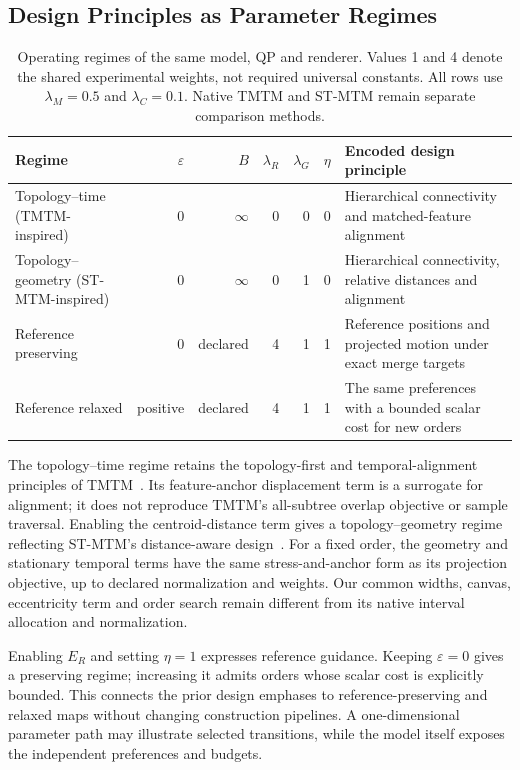 \subsection{Design Principles as Parameter Regimes}
\begin{table}[t]
\caption{Operating regimes of the same model, QP and renderer. Values 1 and 4 denote the shared experimental weights, not required universal constants. All rows use $\lambda_M=0.5$ and $\lambda_C=0.1$. Native TMTM and ST-MTM remain separate comparison methods.}\label{tab:profiles}
\centering\small
\begin{tabular}{p{}rrrrrp{}}\toprule
Regime & $\varepsilon$ & $B$ & $\lambda_R$ & $\lambda_G$ & $\eta$ & Encoded design principle\\\midrule
Topology--time (TMTM-inspired) & 0 & $\infty$ & 0 & 0 & 0 & Hierarchical connectivity and matched-feature alignment\\
Topology--geometry (ST-MTM-inspired) & 0 & $\infty$ & 0 & 1 & 0 & Hierarchical connectivity, relative distances and alignment\\
Reference preserving & 0 & declared & 4 & 1 & 1 & Reference positions and projected motion under exact merge targets\\
Reference relaxed & positive & declared & 4 & 1 & 1 & The same preferences with a bounded scalar cost for new orders\\\bottomrule
\end{tabular}
\end{table}
The topology--time regime retains the topology-first and temporal-alignment principles of TMTM~\cite{Koepp:2023:TMTM}. Its feature-anchor displacement term is a surrogate for alignment; it does not reproduce TMTM's all-subtree overlap objective or sample traversal. Enabling the centroid-distance term gives a topology--geometry regime reflecting ST-MTM's distance-aware design~\cite{STMTM:2026}. For a fixed order, the geometry and stationary temporal terms have the same stress-and-anchor form as its projection objective, up to declared normalization and weights. Our common widths, canvas, eccentricity term and order search remain different from its native interval allocation and normalization.

Enabling $E_R$ and setting $\eta=1$ expresses reference guidance. Keeping $\varepsilon=0$ gives a preserving regime; increasing it admits orders whose scalar cost is explicitly bounded. This connects the prior design emphases to reference-preserving and relaxed maps without changing construction pipelines. A one-dimensional parameter path may illustrate selected transitions, while the model itself exposes the independent preferences and budgets.

